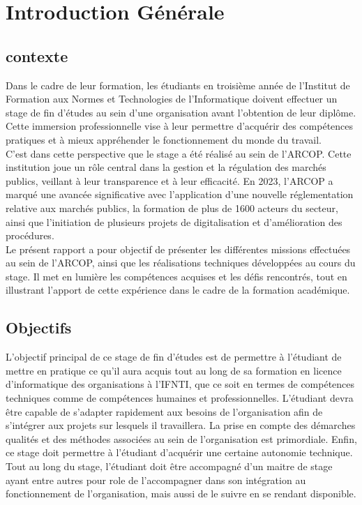\chapter*{Introduction Générale}
\thispagestyle{empty}
\clearpage
\section*{contexte}
\thispagestyle{empty}


Dans le cadre de leur formation, les étudiants en troisième année de l'Institut de Formation aux Normes et Technologies de l'Informatique doivent effectuer un stage de fin d’études au sein d’une organisation avant l’obtention de leur diplôme. Cette immersion professionnelle vise à leur permettre d’acquérir des compétences pratiques et à mieux appréhender le fonctionnement du monde du travail.\\

C’est dans cette perspective que le stage a été réalisé au sein de l’\ac{ARCOP}. Cette institution joue un rôle central dans la gestion et la régulation des marchés publics, veillant à leur transparence et à leur efficacité. En 2023, l'\ac{ARCOP} a marqué une avancée significative avec l’application d’une nouvelle réglementation relative aux marchés publics, la formation de plus de 1600 acteurs du secteur, ainsi que l’initiation de plusieurs projets de digitalisation et d’amélioration des procédures.\\

Le présent rapport a pour objectif de présenter les différentes missions effectuées au sein de l'\ac{ARCOP}, ainsi que les réalisations techniques développées au cours du stage. Il met en lumière les compétences acquises et les défis rencontrés, tout en illustrant l’apport de cette expérience dans le cadre de la formation académique.\\

\section*{Objectifs}

L’objectif principal de ce stage de fin d’études est de permettre à l’étudiant de mettre en pratique ce qu’il aura acquis tout au long de sa formation en licence d’informatique des organisations à l’\ac{IFNTI}, que ce soit en termes de compétences techniques comme de compétences humaines et professionnelles. L’étudiant devra être capable de s’adapter rapidement aux besoins de l’organisation afin de s’intégrer aux projets sur lesquels il travaillera. La prise en compte des démarches qualités et des méthodes associées au sein de l’organisation est primordiale. Enfin, ce stage doit permettre à l’étudiant d’acquérir une certaine autonomie technique.\\
Tout au long du stage, l’étudiant doit être accompagné d’un maitre de stage ayant entre autres pour role de l’accompagner dans son intégration au fonctionnement de l’organisation, mais aussi de le suivre en se rendant disponible.
